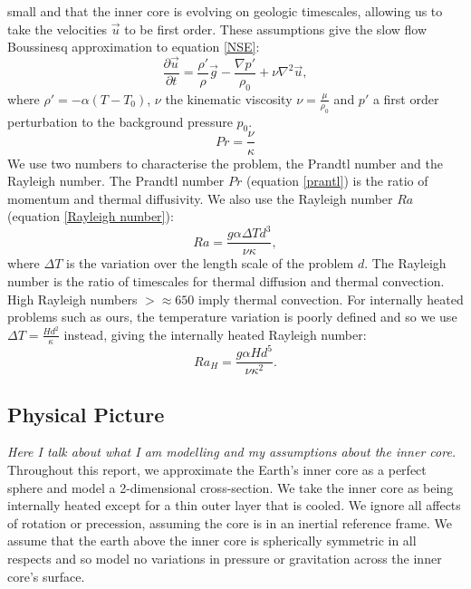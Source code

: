 \documentclass{article}
\begin{document}
small and that the inner core is evolving on geologic timescales, allowing us to take the velocities $\vec{u}$ to be first order. These assumptions give 
the slow flow Boussinesq approximation to equation \ref{NSE}:
\begin{equation}
	\frac{\partial \vec{u}}{\partial t} = \frac{\rho'}{\rho} \vec{g} -   \frac{\nabla p'}{\rho_0} + \nu \nabla^2 \vec{u},
	\label{NSE slow + boussinesq}
\end{equation}
where $\rho'=-\alpha(T - T_0)$, $\nu$ the kinematic viscosity $\nu = \frac{\mu}{\rho_0}$ and $p'$ a first order perturbation to the background pressure $
p_0$. 
\newline
\begin{equation}
	Pr = \frac{\nu}{\kappa}
	\label{prantl}
\end{equation}
We use two numbers to characterise the problem, the Prandtl number and the Rayleigh number. The Prandtl number $Pr$ (equation \ref{prantl}) is the ratio 
of momentum and thermal diffusivity. We also use the Rayleigh number $Ra$ (equation \ref{Rayleigh number}):
\begin{equation}
	Ra = \frac{g \alpha \Delta T  d^3}{\nu \kappa},
	\label{Rayleigh number}
\end{equation}
where $\Delta T$ is the variation over the length scale of the problem $d$. The Rayleigh number is the ratio of timescales for thermal diffusion and 
thermal convection. High Rayleigh numbers $>\approx 650$ imply thermal convection. For internally heated problems such as ours, the temperature 
variation is poorly defined and so we use $\Delta T = \frac{H d^2}{\kappa}$ instead, giving the internally heated Rayleigh number:
\begin{equation}
	Ra_{H} = \frac{g \alpha H d^5}{\nu {\kappa}^2}.
	\label{internally heated rayleigh number}
\end{equation}



\subsection*{Physical Picture}
{\it{Here I talk about what I am modelling and my assumptions about the inner core.}}
Throughout this report, we approximate the Earth's inner core as a perfect sphere and model a 2-dimensional cross-section. We take the inner core as being internally heated except for a thin outer layer that is cooled. We ignore all affects of rotation or precession, assuming the core is in an inertial reference frame. We assume that the earth above the inner core is spherically symmetric in all respects and so model no variations in pressure or gravitation across the inner core's surface.
\end{document}
